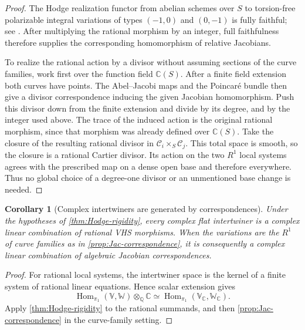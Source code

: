 \documentclass[11pt]{article}
\numberwithin{equation}{section}
\newtheorem{corollary}[corollary]{Corollary}
\theoremstyle{definition}
\theoremstyle{remark}
\newcommand{\C}{\mathbb C}
\newcommand{\Q}{\mathbb Q}
\newcommand{\Hom}{\operatorname{Hom}}
\begin{document}
\begin{proof}
The Hodge realization functor from abelian schemes over $S$ to torsion-free
polarizable integral variations of types $(-1,0)$ and $(0,-1)$ is fully
faithful; see \cite[Rappel~(4.4.3)]{DeligneHodgeII}.  After multiplying the
rational morphism by an integer, full faithfulness therefore supplies the
corresponding homomorphism of relative Jacobians.

To realize the rational action by a divisor without assuming sections
of the curve families, work first over the function field $\C(S)$.
After a finite field extension both curves have points. The Abel--Jacobi
maps and the Poincar\'e bundle then give a divisor correspondence inducing
the given Jacobian homomorphism. Push this divisor down from the finite
extension and divide by its degree, and by the integer used above. The
trace of the induced action is the original rational morphism, since
that morphism was already defined over $\C(S)$.
Take the closure of the resulting rational divisor in
$\mathcal C_i\times_S\mathcal C_j$. This total space is smooth, so the
closure is a rational Cartier divisor. Its action on the two $R^1$
local systems agrees with the prescribed map on a dense open base and
therefore everywhere. Thus no global choice of a degree-one divisor or
an unmentioned base change is needed.
\end{proof}

\begin{corollary}[Complex intertwiners are generated by correspondences]
\label{cor:complex-correspondences}
Under the hypotheses of \cref{thm:Hodge-rigidity}, every complex flat
intertwiner is a complex linear combination of rational VHS morphisms.
When the variations are the $R^1$ of curve families as in
\cref{prop:Jac-correspondence}, it is consequently a complex linear
combination of algebraic Jacobian correspondences.
\end{corollary}

\begin{proof}
For rational local systems, the intertwiner space is the kernel of a finite
system of rational linear equations.  Hence scalar extension gives
\[
  \Hom_{\pi_1}(\mathbb V,\mathbb W)\otimes_{\Q}\C
  \simeq
  \Hom_{\pi_1}(\mathbb V_{\C},\mathbb W_{\C}).
\]
Apply \cref{thm:Hodge-rigidity} to the rational summands, and then
\cref{prop:Jac-correspondence} in the curve-family setting.
\end{proof}
\end{document}
